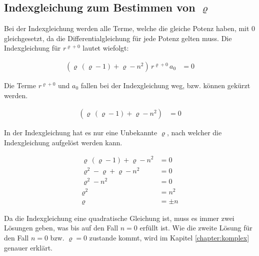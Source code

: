 \subsection[Indexgleichung f\"ur $\varrho$]{Indexgleichung zum Bestimmen von $\varrho$}
\begin{normalsize}
Bei der Indexgleichung werden alle Terme,
welche die gleiche Potenz haben,
mit $0$ gleichgesetzt,
da die Differentialgleichung f\"ur jede Potenz gelten muss.
Die Indexgleichung f\"ur $r^{\varrho + 0}$ lautet wiefolgt:
\end{normalsize}
\begin{align}
	\left( \varrho \, \left( \varrho -1 \right) + \varrho - n^2 \right)
	\, r^{\varrho + 0} \, a_0 &= 0
	\label{eq:bessel:indexgleichung:ausgangslage}
\end{align}
\begin{normalsize}
Die Terme $r^{\varrho + 0}$ und $a_0$ fallen bei der Indexgleichung  weg,
\acs{bzw.} k\"onnen gek\"urzt werden.
\end{normalsize}
\begin{align}
	\left( \varrho \, \left( \varrho -1 \right) + \varrho - n^2 \right) &= 0
	\label{eq:bessel:indexgleichung:ausgangslage:vereinfacht}
\end{align}
\begin{normalsize}
In der Indexgleichung  hat es nur eine Unbekannte $\varrho$,
nach welcher die Indexgleichung aufgel\"ost werden kann.
\end{normalsize}
\begin{align*}
	\varrho \, \left( \varrho -1 \right) + \varrho - n^2 &= 0 \\
	\varrho ^2 - \varrho + \varrho -n^2 &= 0  \\
	\varrho ^2 - n^2 &= 0 \\
	\varrho ^2 &= n^2 \\
	\varrho &= \pm n
\end{align*}
\begin{normalsize}
Da die Indexgleichung eine quadratische Gleichung ist,
muss es immer zwei L\"osungen geben,
was bis auf den Fall $n = 0$ erf\"ullt ist.
Wie die zweite L\"osung f\"ur den Fall $n = 0$ \acs{bzw.} $\varrho = 0$ zustande kommt,
wird im Kapitel \ref{chapter:komplex} genauer erkl\"art.
\end{normalsize}
